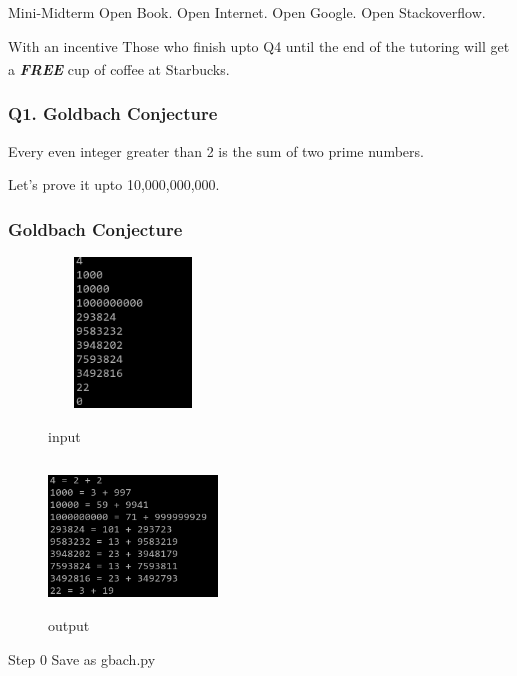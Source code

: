 \documentclass{beamer}
\begin{document}
\begin{frame}{Mini-Midterm}
  Open Book. Open Internet.
  Open Google. Open Stackoverflow.
\end{frame}

\begin{frame}{With an incentive}
  Those who finish upto Q4 until the end of the tutoring will get a
  \textbf{\textit{FREE}} cup of
  coffee at Starbucks\textsuperscript{\tiny\textregistered}.
\end{frame}

\begin{frame}
\frametitle{Q1. Goldbach Conjecture}
Every even integer greater than 2 is the sum of two prime numbers.

Let's prove it upto 10,000,000,000.
\end{frame}

\begin{frame}
\frametitle{Goldbach Conjecture}
\begin{figure}[H]
  \centering
  \begin{minipage}{.45\textwidth}
  \centering
    \includegraphics[width=45mm,height=40mm]{./gbach_input.png}
    \caption*{input}
  \end{minipage}
  \begin{minipage}{.45\textwidth}
  \centering
    \includegraphics[width=45mm,height=40mm]{./gbach_output.png}
    \caption*{output}
  \end{minipage}
\end{figure}
\end{frame}

\begin{frame}{Step 0}
  Save as gbach.py
\end{frame}
\end{document}
